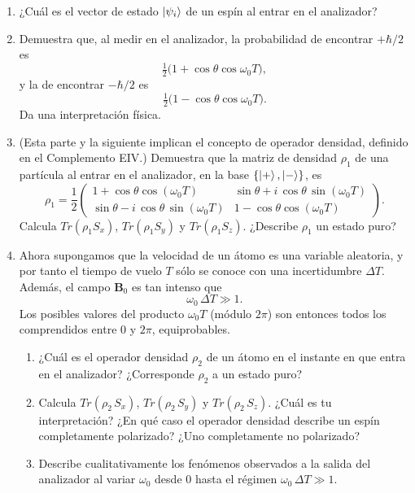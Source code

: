 \documentclass[a4paper,11pt]{article}
\begin{document}
\begin{enumerate}
  \item ¿Cuál es el vector de estado \(\ket{\psi_i}\) de un espín al entrar en el analizador?
  \item Demuestra que, al medir en el analizador, la probabilidad de encontrar \(+\hbar/2\) es
  \[
    \tfrac12\bigl(1+\cos\theta\cos\omega_0 T\bigr),
  \]
  y la de encontrar \(-\hbar/2\) es
  \[
    \tfrac12\bigl(1-\cos\theta\cos\omega_0 T\bigr).
  \]
  Da una interpretación física.
  \item (Esta parte y la siguiente implican el concepto de operador densidad, definido en el Complemento EIV.) Demuestra que la matriz de densidad \(\rho_1\) de una partícula al entrar en el analizador, en la base \(\{\ket{+},\ket{-}\}\), es
  \[
    \rho_1 = \frac12
    \begin{pmatrix}
      1 + \cos\theta\cos(\omega_0 T)                  & \sin\theta + i\,\cos\theta\,\sin(\omega_0 T) \\[6pt]
      \sin\theta - i\,\cos\theta\,\sin(\omega_0 T)     & 1 - \cos\theta\cos(\omega_0 T)
    \end{pmatrix}.
  \]
  Calcula \( Tr(\rho_1 S_x)\), \( Tr(\rho_1 S_y)\) y \( Tr(\rho_1 S_z)\). ¿Describe \(\rho_1\) un estado puro?

\item Ahora supongamos que la velocidad de un átomo es una variable aleatoria, y por tanto el tiempo de vuelo \(T\) sólo se conoce con una incertidumbre \(\Delta T\). Además, el campo \(\mathbf{B}_0\) es tan intenso que 
\[
\omega_0\,\Delta T \gg 1.
\]
Los posibles valores del producto \(\omega_0 T\) (módulo \(2\pi\)) son entonces todos los comprendidos entre \(0\) y \(2\pi\), equiprobables.

  \begin{enumerate}
    \item ¿Cuál es el operador densidad \(\rho_2\) de un átomo en el instante en que entra en el analizador? ¿Corresponde \(\rho_2\) a un estado puro?
    \item Calcula \( Tr(\rho_2\,S_x)\), \( Tr(\rho_2\,S_y)\) y \( Tr(\rho_2\,S_z)\). ¿Cuál es tu interpretación? ¿En qué caso el operador densidad describe un espín completamente polarizado? ¿Uno completamente no polarizado?
    \item Describe cualitativamente los fenómenos observados a la salida del analizador al variar \(\omega_0\) desde \(0\) hasta el régimen \(\omega_0\,\Delta T\gg1\).
  \end{enumerate}

\end{enumerate}
\end{document}
